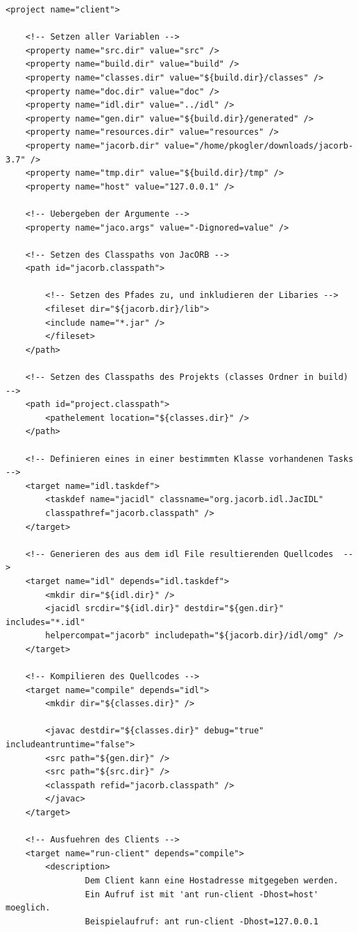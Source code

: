 \begin{lstlisting}[basicstyle=\tiny, style=XML, caption=Code des Clients \cite{borkoRepo}]
<project name="client">
	
	<!-- Setzen aller Variablen -->
	<property name="src.dir" value="src" />
	<property name="build.dir" value="build" />
	<property name="classes.dir" value="${build.dir}/classes" />
	<property name="doc.dir" value="doc" />
	<property name="idl.dir" value="../idl" />
	<property name="gen.dir" value="${build.dir}/generated" />
	<property name="resources.dir" value="resources" />
	<property name="jacorb.dir" value="/home/pkogler/downloads/jacorb-3.7" />
	<property name="tmp.dir" value="${build.dir}/tmp" />
	<property name="host" value="127.0.0.1" />
	
	<!-- Uebergeben der Argumente -->
	<property name="jaco.args" value="-Dignored=value" />
	
	<!-- Setzen des Classpaths von JacORB -->
	<path id="jacorb.classpath">
	
		<!-- Setzen des Pfades zu, und inkludieren der Libaries -->
		<fileset dir="${jacorb.dir}/lib">
		<include name="*.jar" />
		</fileset>
	</path>
	
	<!-- Setzen des Classpaths des Projekts (classes Ordner in build) -->
	<path id="project.classpath">
		<pathelement location="${classes.dir}" />
	</path>
	
	<!-- Definieren eines in einer bestimmten Klasse vorhandenen Tasks -->
	<target name="idl.taskdef">
		<taskdef name="jacidl" classname="org.jacorb.idl.JacIDL"
		classpathref="jacorb.classpath" />
	</target>
	
	<!-- Generieren des aus dem idl File resultierenden Quellcodes  -->
	<target name="idl" depends="idl.taskdef">
		<mkdir dir="${idl.dir}" />
		<jacidl srcdir="${idl.dir}" destdir="${gen.dir}" includes="*.idl"
		helpercompat="jacorb" includepath="${jacorb.dir}/idl/omg" />
	</target>
	
	<!-- Kompilieren des Quellcodes -->
	<target name="compile" depends="idl">
		<mkdir dir="${classes.dir}" />
	
		<javac destdir="${classes.dir}" debug="true" includeantruntime="false">
		<src path="${gen.dir}" />
		<src path="${src.dir}" />
		<classpath refid="jacorb.classpath" />
		</javac>
	</target>
	
	<!-- Ausfuehren des Clients -->
	<target name="run-client" depends="compile">
		<description>
				Dem Client kann eine Hostadresse mitgegeben werden.
				Ein Aufruf ist mit 'ant run-client -Dhost=host' moeglich.
				Beispielaufruf: ant run-client -Dhost=127.0.0.1
				

\end{lstlisting}
